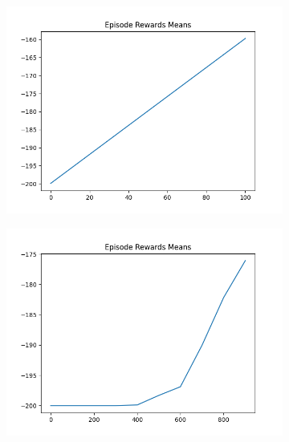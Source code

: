 \begin{figure}[H]
\begin{subfigure}{.47\linewidth}
        \includegraphics[width=\textwidth]{mountain/2024-06-15_13-39-22_dqn_mountaincar_episode_rewards_means.png}
    \end{subfigure}
    \begin{subfigure}{.47\linewidth}
        \centering
        \includegraphics[width=\textwidth]{mountain/2024-06-15_11-21-25_dqn_mountaincar_episode_rewards_means.png}
    \end{subfigure}
\end{figure}
